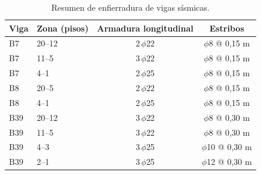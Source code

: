 \begin{table}[H]
\centering
\caption{Resumen de enfierradura de vigas sísmicas.}
\label{tab:viga_resumen}
\begin{tabular}{llcc}
\hline
Viga & Zona (pisos) & Armadura longitudinal & Estribos \\
\hline
B7  & 20--12 & 2\,\(\phi\)22 & \(\phi\)8 @ 0,15 m \\
B7  & 11--5  & 3\,\(\phi\)22 & \(\phi\)8 @ 0,15 m \\
B7  & 4--1   & 2\,\(\phi\)25 & \(\phi\)8 @ 0,15 m \\
\hline
B8  & 20--5  & 2\,\(\phi\)22 & \(\phi\)8 @ 0,15 m \\
B8  & 4--1   & 2\,\(\phi\)25 & \(\phi\)8 @ 0,15 m \\
\hline
B39 & 20--12 & 3\,\(\phi\)22 & \(\phi\)8  @ 0,30 m \\
B39 & 11--5  & 3\,\(\phi\)22 & \(\phi\)8  @ 0,30 m \\
B39 & 4--3   & 3\,\(\phi\)25 & \(\phi\)10 @ 0,30 m \\
B39 & 2--1   & 3\,\(\phi\)25 & \(\phi\)12 @ 0,30 m \\
\hline
\end{tabular}
\end{table}
 